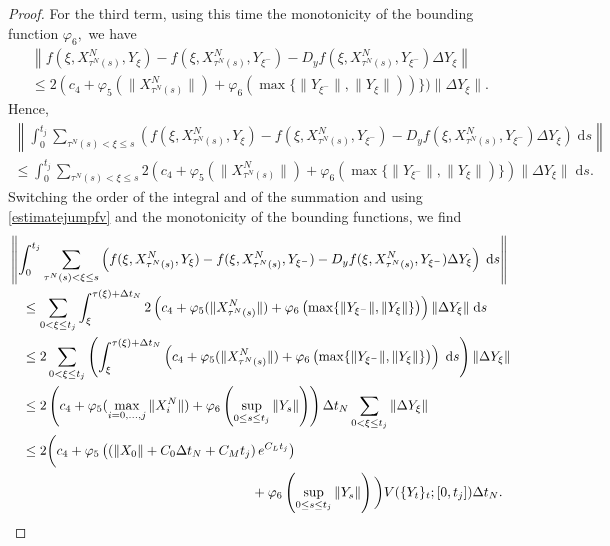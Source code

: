 \documentclass[reqno,12pt]{amsart}
\theoremstyle{plain} %
\theoremstyle{definition} %
\begin{document}
\begin{proof}
    For the third term, using this time the monotonicity of the bounding function $\varphi_6,$ we have
    \begin{multline*}
        \left\|f(\xi, X_{\tau^N(s)}^N, Y_\xi) - f(\xi, X_{\tau^N(s)}^N, Y_{\xi^{-}}) - D_y f(\xi, X_{\tau^N(s)}^N, Y_{\xi^-})\Delta Y_\xi\right\| \\
        \leq 2(c_4 + \varphi_5(\|X_{\tau^N(s)}^N\|) + \varphi_6(\max\{\|Y_{\xi^{-}}\|, \|Y_{\xi}\|))\})\|\Delta Y_\xi\|.
    \end{multline*}
    Hence,
    \begin{multline*}
        \left\|\int_0^{t_j} \sum_{\tau^N(s) < \xi \leq s} \left(f(\xi, X_{\tau^N(s)}^N, Y_\xi) - f(\xi, X_{\tau^N(s)}^N, Y_{\xi^{-}}) - D_y f(\xi, X_{\tau^N(s)}^N, Y_{\xi^-})\Delta Y_\xi\right)\;\mathrm{d}s\right\| \\
        \leq \int_0^{t_j} \sum_{\tau^N(s) < \xi \leq s} 2(c_4 + \varphi_5(\|X_{\tau^N(s)}^N\|) + \varphi_6(\max\{\|Y_{\xi^{-}}\|, \|Y_{\xi}\|)\})\|\Delta Y_\xi\|\;\mathrm{d}s.
    \end{multline*}
    Switching the order of the integral and of the summation and using \eqref{estimatejumpfv} and the monotonicity of the bounding functions, we find
    \begin{align*}
        & \left\|\int_0^{t_j} \sum_{\tau^N(s) < \xi \leq s} \left(f(\xi, X_{\tau^N(s)}^N, Y_\xi) - f(\xi, X_{\tau^N(s)}^N, Y_{\xi^{-}}) - D_y f(\xi, X_{\tau^N(s)}^N, Y_{\xi^-})\Delta Y_\xi\right)\;\mathrm{d}s\right\| \\
        & \quad \leq \sum_{0 < \xi \leq t_j} \int_{\xi}^{\tau(\xi)+\Delta t_N} 2\left(c_4 + \varphi_5(\|X_{\tau^N(s)}^N\|) + \varphi_6\left(\max\{\|Y_{\xi^{-}}\|, \|Y_{\xi}\|\}\right)\right)\|\Delta Y_\xi\|\;\mathrm{d}s \\
        & \quad \leq 2 \sum_{0 < \xi \leq t_j} \left(\int_{\xi}^{\tau(\xi)+\Delta t_N} \left(c_4 + \varphi_5(\|X_{\tau^N(s)}^N\|) + \varphi_6\left(\max\{\|Y_{\xi^{-}}\|, \|Y_{\xi}\|\}\right)\right)\;\mathrm{d}s \right)\|\Delta Y_\xi\| \\
        & \quad \leq 2\left(c_4 + \varphi_5(\max_{i=0, \ldots, j}\|X_i^N\|) + \varphi_6\left(\sup_{0\leq s \leq t_j}\|Y_s\|\right)\right) \Delta t_N\sum_{0 < \xi \leq t_j} \|\Delta Y_\xi\| \\
        & \quad \leq 2\bigg(c_4 + \varphi_5\left(\left(\|X_0\| + C_0\Delta t_N + C_M t_j \right)e^{C_L t_j}\right) \\
        & \hspace{2.5in} + \varphi_6\left(\sup_{0\leq s \leq t_j}\|Y_s\|\right)\bigg) V(\{Y_t\}_t; [0, t_j]) \Delta t_N.

\end{align*}
\end{proof}
\end{document}
